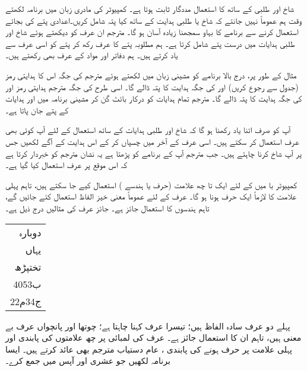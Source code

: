 شاخ اور طلبی  کے ساتھ کا استعمال مددگار ثابت ہوتا ہے۔ کمپیوٹر کی مادری زبان میں برنامہ لکھتے وقت  ہم عموماً نہیں جانتے کہ شاخ یا طلبی ہدایت کے ساتھ کیا پتہ شامل کریں۔اعدادی پتے کی بجائے  استعمال کرنے سے  برنامے کا بہاو  سمجھنا  زیادہ  آسان ہو گا۔ مترجم ان عرف  کو دیکھتے ہوئے شاخ اور طلبی  ہدایات میں  درست پتے شامل کرتا ہے۔ ہم مطلوبہ پتے کا  عرف  رکھ کر پتے کو اسی عرف سے یاد کرتے ہیں۔ ہم دفاتر اور مواد  کے عرف بھی رکھتے ہیں۔

مثال کے طور پر، درج بالا برنامے کو مشینی زبان میں  لکھتے ہوئے مترجم  \sJZ کی جگہ اس کا ہدایتی رمز   (جدول  سے رجوع کریں)  اور    کی جگہ \sHLT ہدایت کا پتہ ڈالے گا۔ اسی طرح \sJMP کی جگہ مترجم  ہدایتی رمز    اور    کی جگہ   ہدایت \DCR{\regC} کا پتہ ڈالے گا۔ مترجم تمام ہدایات کو درکار بائٹ گن کر    مشینی برنامہ میں   \sHLT اور \sJMP ہدایات کے پتے جان پاتا ہے۔

آپ کو صرف اتنا یاد رکھنا ہو گا کہ شاخ اور طلبی ہدایات کے ساتھ استعمال کے لئے  آپ کوئی بھی  عرف  استعمال کر سکتے ہیں۔ اسی عرف کے آخر میں   چسپاں کر کے  اس ہدایت کے آگے لکھیں جس پر آپ شاخ کرنا  چاہتے ہیں۔ جب مترجم آپ کے برنامے کو پڑھتا ہے یہ نشان  مترجم کو خبردار کرتا ہے کہ اس  موقع پر  عرف  استعمال کیا گیا ہے۔

کمپیوٹر با میں کے لئے ایک  تا  چھ    علامت (حرف یا ہندسے ) استعمال کیے جا سکتے ہیں، تاہم پہلی علامت کا  لازماً ایک  حرف  ہونا ہو گا۔ عرف کے  لئے  عموماً معنی خیز الفاظ استعمال کئے جائیں گے،  تاہم ہندسوں کا استعمال جائز ہے۔ جائز عرف کی  مثالیں درج ذیل ہے۔
 \begin{center}
\begin{tabular}{r}
دوبارہ\\ 
یہاں\\
تختپڑھ\\
ب4053\\
ج34م22 
\end{tabular}
\end{center}
پہلے دو  عرف   سادہ الفاظ ہیں؛ تیسرا  عرف    کہنا چاہتا ہے؛ چوتھا اور پانچواں  عرف بے معنی   ہیں، تاہم ان کا استعمال جائز ہے۔ عرف کی لمبائی پر چھ علامتوں کی  پابندی اور پہلی علامت    پر  حرف ہونے کی   پابندی  ، عام  دستیاب مترجم    بھی عائد کرتے ہیں۔
ایسا برنامہ لکھیں جو عشری  اور  آپس میں جمع کرے۔

